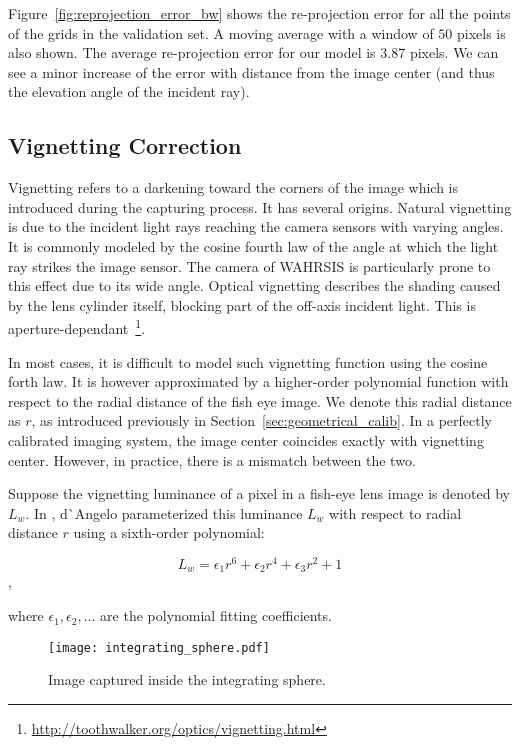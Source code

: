 Figure~\ref{fig:reprojection_error_bw} shows the re-projection error for all the points of the grids in the validation set. A moving average with a window of $50$ pixels is also shown. The average re-projection error for our model is $3.87$ pixels. We can see a minor increase of the error with distance from the image center (and thus the elevation angle of the incident ray).





\subsection{Vignetting Correction}
\label{sec:intensity}

Vignetting refers to a darkening toward the corners of the image which is introduced during the capturing process. It has several origins. Natural vignetting is due to the incident light rays reaching the camera sensors with varying angles. It is commonly modeled by the cosine fourth law of the angle at which the light ray strikes the image sensor. The camera of WAHRSIS is particularly prone to this effect due to its wide angle. Optical vignetting describes the shading caused by the lens cylinder itself, blocking part of the off-axis incident light. This is aperture-dependant~\footnote{\url{http://toothwalker.org/optics/vignetting.html}}.

In most cases, it is difficult to model such vignetting function using the cosine forth law. It is however approximated by a higher-order polynomial function with respect to the radial distance of the fish eye image. We denote this radial distance as $r$, as introduced previously in Section~\ref{sec:geometrical_calib}. In a perfectly calibrated imaging system, the image center coincides exactly with vignetting center. However, in practice, there is a mismatch between the two.

Suppose the vignetting luminance of a pixel in a fish-eye lens image is denoted by $L_w$. In \cite{d2007radiometric}, d\`{}Angelo parameterized this luminance $L_w$ with respect to radial distance $r$ using a sixth-order polynomial: 

\[L_w = \epsilon_1 r^6 + \epsilon_2 r^4 + \epsilon_3 r^2 + 1\],

where $\epsilon_1, \epsilon_2, \ldots$ are the polynomial fitting coefficients. 

\begin{figure}[htb]
\begin{center}
\texttt{[image: integrating\_sphere.pdf]}
\caption{Image captured inside the integrating sphere.\label{fig:sphere}}
\end{center}
\end{figure}

